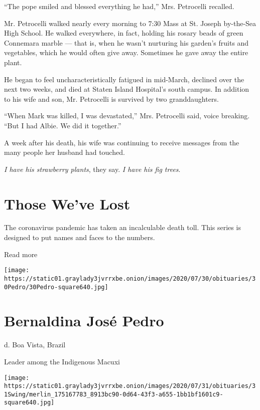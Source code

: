 ``The pope smiled and blessed everything he had,'' Mrs. Petrocelli
recalled.

Mr. Petrocelli walked nearly every morning to 7:30 Mass at St. Joseph
by-the-Sea High School. He walked everywhere, in fact, holding his
rosary beads of green Connemara marble --- that is, when he wasn't
nurturing his garden's fruits and vegetables, which he would often give
away. Sometimes he gave away the entire plant.

He began to feel uncharacteristically fatigued in mid-March, declined
over the next two weeks, and died at Staten Island Hospital's south
campus. In addition to his wife and son, Mr. Petrocelli is survived by
two granddaughters.

``When Mark was killed, I was devastated,'' Mrs. Petrocelli said, voice
breaking. ``But I had Albie. We did it together.''

A week after his death, his wife was continuing to receive messages from
the many people her husband had touched.

\emph{I have his strawberry plants}, they say. \emph{I have his fig
trees}.

\href{https://www.nytimes3xbfgragh.onion/interactive/2020/obituaries/people-died-coronavirus-obituaries.html?action=click\&pgtype=Article\&state=default\&region=BELOW_MAIN_CONTENT\&context=covid_obits_promo}{}

\hypertarget{those-weve-lost}{%
\section{Those We've Lost}\label{those-weve-lost}}

The coronavirus pandemic has taken an incalculable death toll. This
series is designed to put names and faces to the numbers.

Read more

\texttt{[image: https://static01.graylady3jvrrxbe.onion/images/2020/07/30/obituaries/30Pedro/30Pedro-square640.jpg]}

\hypertarget{bernaldina-josuxe9-pedro}{%
\section{Bernaldina José Pedro}\label{bernaldina-josuxe9-pedro}}

d. Boa Vista, Brazil

Leader among the Indigenous Macuxi

\texttt{[image: https://static01.graylady3jvrrxbe.onion/images/2020/07/31/obituaries/31Swing/merlin\_175167783\_8913bc90-0d64-43f3-a655-1bb1bf1601c9-square640.jpg]}

